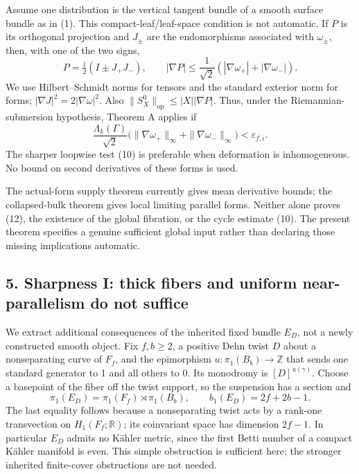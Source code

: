 \documentclass[
  11pt,
]{article}
\begin{document}
Assume one distribution is the vertical tangent bundle of a smooth
surface bundle as in (1). This compact-leaf/leaf-space condition is not
automatic. If \(P\) is its orthogonal projection and \(J_\pm\) are the
endomorphisms associated with \(\omega_\pm\), then, with one of the two
signs, \[
 P=\tfrac12(I\pm J_+J_-),\qquad
 |\nabla P|\le\frac1{\sqrt2}
                     (|\nabla\omega_+|+|\nabla\omega_-|).
\tag{13}
\] We use Hilbert--Schmidt norms for tensors and the standard exterior
norm for forms; \(|\nabla J|^2=2|\nabla\omega|^2\). Also
\(\|S_X^0\|_{\mathrm{op}}\le |X||\nabla P|\). Thus, under the
Riemannian-submersion hypothesis, Theorem A applies if \[
 \frac{\Lambda_k(\Gamma)}{\sqrt2}
       \bigl(\|\nabla\omega_+\|_\infty+
             \|\nabla\omega_-\|_\infty\bigr)
                              <\varepsilon_{f,\iota}.
\tag{14}
\] The sharper loopwise test (10) is preferable when deformation is
inhomogeneous. No bound on second derivatives of these forms is used.

The actual-form supply theorem currently gives mean derivative bounds;
the collapsed-bulk theorem gives local limiting parallel forms. Neither
alone proves (12), the existence of the global fibration, or the cycle
estimate (10). The present theorem specifies a genuine sufficient global
input rather than declaring those missing implications automatic.

\hypertarget{sharpness-i-thick-fibers-and-uniform-near-parallelism-do-not-suffice}{%
\subsection{5. Sharpness I: thick fibers and uniform near-parallelism do
not
suffice}\label{sharpness-i-thick-fibers-and-uniform-near-parallelism-do-not-suffice}}

We extract additional consequences of the inherited fixed bundle
\(E_D\), not a newly constructed smooth object. Fix \(f,b\ge2\), a
positive Dehn twist \(D\) about a nonseparating curve of \(F_f\), and
the epimorphism \(u:\pi_1(B_b)\to\mathbb Z\) that sends one standard
generator to 1 and all others to 0. Its monodromy is
\([D]^{u(\gamma)}\). Choose a basepoint of the fiber off the twist
support, so the suspension has a section and \[
 \pi_1(E_D)=\pi_1(F_f)\rtimes\pi_1(B_b),\qquad
 b_1(E_D)=2f+2b-1.
\tag{15}
\] The last equality follows because a nonseparating twist acts by a
rank-one transvection on \(H_1(F_f;\mathbb R)\); its coinvariant space
has dimension \(2f-1\). In particular \(E_D\) admits no Kähler metric,
since the first Betti number of a compact Kähler manifold is even. This
simple obstruction is sufficient here; the stronger inherited
finite-cover obstructions are not needed.
\end{document}
